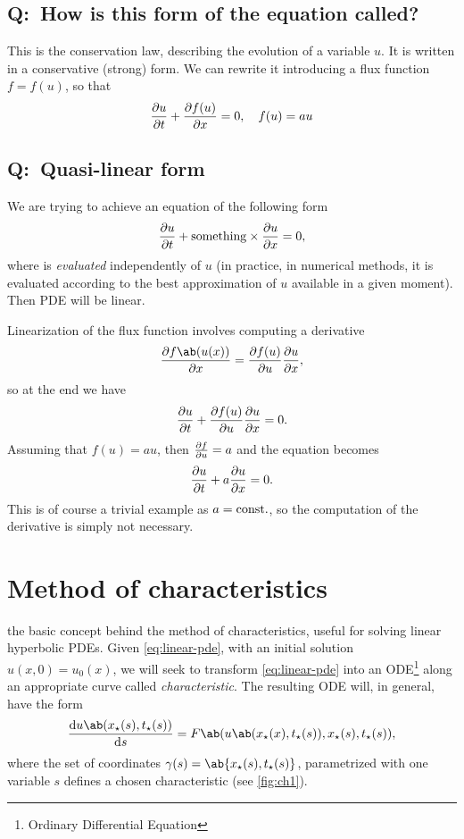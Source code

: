 \documentclass[justified, nobib, a4page]{tufte-handout}
\newcommand{\Q}[1]{\subsection{Q:~{#1}}}
\begin{document}
\Q{How is this form of the equation called?}
This is the conservation law, describing the evolution of a variable \(u\). It is
written in a conservative (strong) form. We can rewrite it introducing a flux
function \(f=f(u)\), so that
\[
	\pdv{u}{t} + \pdv{f(u)}{x} = 0, \quad f(u) = au
\]

\Q{Quasi-linear form}
We are trying to achieve an equation of the following form
\begin{equation}
	\pdv{u}{t} + \mathrm{something}\times\pdv{u}{x} = 0,
	\label{eq:quasi-lin}
\end{equation}
where  is \emph{evaluated} independently of \(u\) (in practice,
in numerical methods, it is evaluated according to the best approximation of
\(u\) available in a given moment). Then PDE will be linear.

Linearization of the flux function involves computing a derivative
\[
	\pdv{f\ab(u(x))}{x} = \pdv{f(u)}{u}\pdv{u}{x},
\]
so at the end we have
\[
	\pdv{u}{t} + \pdv{f(u)}{u}\pdv{u}{x} = 0.
\]
Assuming that \(f(u) = au\), then \(\pdv{f}{u} = a\) and the equation becomes
\[
	\pdv{u}{t} + a\pdv{u}{x} = 0.
\]
This is of course a trivial example as \(a=\mathrm{const.}\), so the computation of the
derivative is simply not necessary.



\section{Method of characteristics}

 the basic concept behind the method of
characteristics, useful for solving linear hyperbolic PDEs. Given
\cref{eq:linear-pde}, with an initial solution \(u(x, 0) = u_0(x)\), we will
seek to transform \cref{eq:linear-pde} into an ODE\footnote{Ordinary
	Differential Equation} along an appropriate curve called \emph{characteristic}.
The resulting ODE will, in general, have the form
\begin{equation}
	\odv{u\ab(x_\star(s), t_\star(s))}{s}
	= F\ab(u\ab(x_\star(x), t_\star(s)), x_\star(s), t_\star(s)),
	\label{eq:char-gen}
\end{equation}
where the set of coordinates \(\gamma(s) = \ab\{x_\star(s), t_\star(s)\}\),
parametrized with one variable \(s\) defines a chosen characteristic (see
\cref{fig:ch1}).
\end{document}
